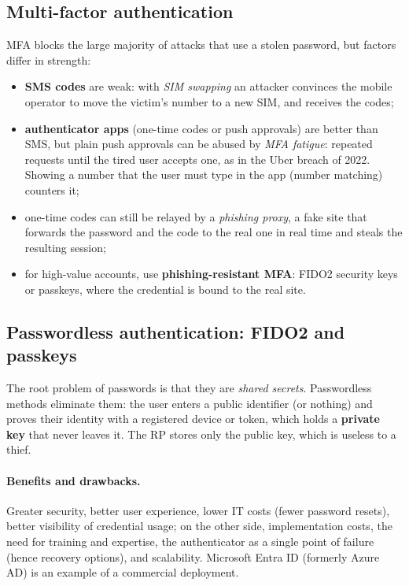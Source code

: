 \subsection{Multi-factor authentication}

MFA blocks the large majority of attacks that use a stolen password, but factors differ in strength:
\begin{itemize}
    \item \textbf{SMS codes} are weak: with \emph{SIM swapping} an attacker convinces the mobile operator to move the victim's number to a new SIM, and receives the codes;
    \item \textbf{authenticator apps} (one-time codes or push approvals) are better than SMS, but plain push approvals can be abused by \emph{MFA fatigue}: repeated requests until the tired user accepts one, as in the Uber breach of 2022. Showing a number that the user must type in the app (number matching) counters it;
    \item one-time codes can still be relayed by a \emph{phishing proxy}, a fake site that forwards the password and the code to the real one in real time and steals the resulting session;
    \item for high-value accounts, use \textbf{phishing-resistant MFA}: FIDO2 security keys or passkeys, where the credential is bound to the real site.
\end{itemize}

\subsection{Passwordless authentication: FIDO2 and passkeys}

The root problem of passwords is that they are \emph{shared secrets}. Passwordless methods eliminate them: the user enters a public identifier (or nothing) and proves their identity with a registered device or token, which holds a \textbf{private key} that never leaves it. The RP stores only the public key, which is useless to a thief.

\paragraph{Benefits and drawbacks.} Greater security, better user experience, lower IT costs (fewer password resets), better visibility of credential usage; on the other side, implementation costs, the need for training and expertise, the authenticator as a single point of failure (hence recovery options), and scalability. Microsoft Entra ID (formerly Azure AD) is an example of a commercial deployment.

